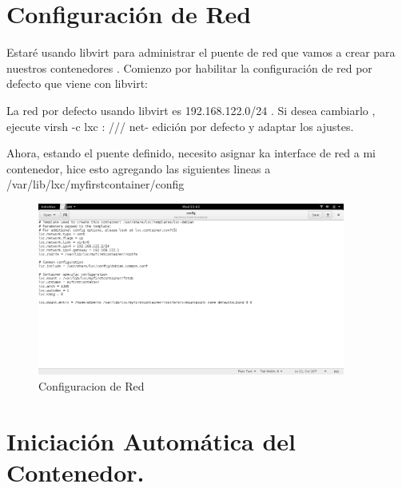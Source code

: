 \documentclass[1pt]{article} %
\begin{document}
\section{Configuración de Red}

Estaré usando libvirt para administrar el puente de red que vamos a crear para nuestros contenedores . Comienzo por habilitar la configuración de red por defecto que viene con libvirt:
\begin{center}\end{center}
\begin{center}\end{center}
\begin{center}\end{center}

La red por defecto usando libvirt es 192.168.122.0/24 . Si desea cambiarlo , ejecute virsh -c lxc : /// net- edición por defecto y adaptar los ajustes.

\newpage

Ahora, estando el puente definido, necesito asignar ka interface de red a mi contenedor, hice esto agregando las siguientes lineas a /var/lib/lxc/myfirstcontainer/config

\begin{figure}[!ht]
	\begin{center}
		\includegraphics[width=0.9\textwidth]{20.png}
		\caption{Configuracion de Red }
	\end{center}
\end{figure}

\section{Iniciación Automática del Contenedor.}
\end{document}
